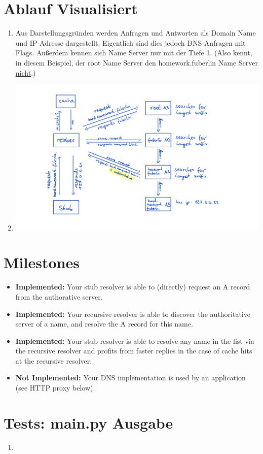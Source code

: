 \section{Ablauf Visualisiert}
\begin{enumerate}[ ]
    \item Aus Darstellungsgründen werden Anfragen und Antworten als Domain Name und IP-Adresse dargestellt. Eigentlich sind dies jedoch DNS-Anfragen mit Flags. Außerdem kennen sich Name Server nur mit der Tiefe 1. (Also kennt, in diesem Beispiel, der root Name Server den homework.fuberlin Name Server \underline{nicht}.)
    \item \includegraphics[width=1\textwidth]{pics/1.png}
\end{enumerate}




\section{Milestones}
\begin{itemize}
    \item \textbf{Implemented:} Your stub resolver is able to (directly) request an A record from the authorative server.
    \item \textbf{Implemented:} Your recursive resolver is able to discover the authoritative server of a name, and resolve the A record for this name.
    \item \textbf{Implemented:} Your stub resolver is able to resolve any name in the list via the recursive resolver and profits from faster replies in the case of cache hits at the recursive resolver.
    \item \textbf{Not Implemented:} Your DNS implementation is used by an application (see HTTP proxy below).
\end{itemize}  

\newpage
\section{Tests: main.py Ausgabe}
\begin{enumerate}[]
    \item 

\end{enumerate}   

